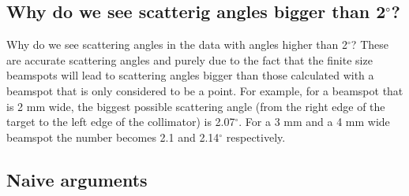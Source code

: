 \documentclass[11pt]{report}
\begin{document}
\subsection{Why do we see scatterig angles bigger than 2$^{\circ}$?}

Why do we see scattering angles in the data with angles higher than 2$^{\circ}$?
These are accurate scattering angles and purely due to the fact that the finite size beamspots will lead to 
scattering angles bigger than those calculated with a beamspot that is only considered to be a point.
For example, for a beamspot that is 2 mm wide, the biggest possible scattering angle (from the right edge of the target 
to the left edge of the collimator) is 2.07$^{\circ}$. For a 3 mm and a 4 mm wide beamspot the number becomes
2.1 and 2.14$^{\circ}$ respectively.





\subsection{Naive arguments}
\end{document}
